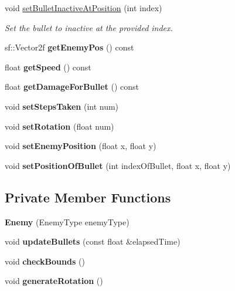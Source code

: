 \begin{DoxyCompactItemize}
void \hyperlink{class_enemy_a02e1cacf8fad39bbcc28271a53637024}{set\+Bullet\+Inactive\+At\+Position} (int index)
\begin{DoxyCompactList}\small\item\em Set the bullet to inactive at the provided index. \end{DoxyCompactList}\item 
\mbox{\label{class_enemy_a9f5b6b7b70f7f3532e82eebcab2e26e8}} 
sf\+::\+Vector2f {\bfseries get\+Enemy\+Pos} () const
\item 
\mbox{\label{class_enemy_a342051a8cf9fe6e329774e37af486fca}} 
float {\bfseries get\+Speed} () const
\item 
\mbox{\label{class_enemy_a73e88b0f1e68650e6ea536c53a3cf920}} 
float {\bfseries get\+Damage\+For\+Bullet} () const
\item 
\mbox{\label{class_enemy_a8ddda321d45a2fa6f35272087afe258b}} 
void {\bfseries set\+Steps\+Taken} (int num)
\item 
\mbox{\label{class_enemy_ad02b7dfac0339e110f9aba837a815782}} 
void {\bfseries set\+Rotation} (float num)
\item 
\mbox{\label{class_enemy_a6a83e4ff9dab297dbec1644dcc9152c6}} 
void {\bfseries set\+Enemy\+Position} (float x, float y)
\item 
\mbox{\label{class_enemy_a49e2b8533dc258764e7a0ee5c4990eeb}} 
void {\bfseries set\+Position\+Of\+Bullet} (int index\+Of\+Bullet, float x, float y)
\end{DoxyCompactItemize}
\subsection*{Private Member Functions}
\begin{DoxyCompactItemize}
\item 
\mbox{\label{class_enemy_a57306ac8f82213245655f4c5377b1d76}} 
{\bfseries Enemy} (Enemy\+Type enemy\+Type)
\item 
\mbox{\label{class_enemy_a85b0344388ba2e073bd610cf88025037}} 
void {\bfseries update\+Bullets} (const float \&elapsed\+Time)
\item 
\mbox{\label{class_enemy_ab446b847a18890227905674734f7017e}} 
void {\bfseries check\+Bounds} ()
\item 
\mbox{\label{class_enemy_a66c71c54afd65734ed82983882a940e6}} 
void {\bfseries generate\+Rotation} ()
\end{DoxyCompactItemize}

